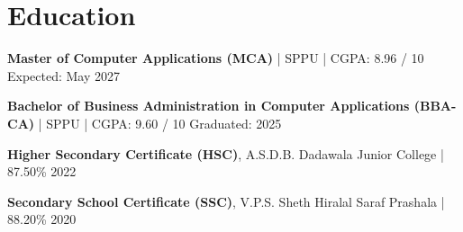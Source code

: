 \documentclass[a4paper,10pt]{article}
\begin{document}
\section*{Education}

\textbf{Master of Computer Applications (MCA)} | SPPU | CGPA: 8.96 / 10 \hfill Expected: May 2027

\vspace{4pt}

\textbf{Bachelor of Business Administration in Computer Applications (BBA-CA)} | SPPU | CGPA: 9.60 / 10 \hfill Graduated: 2025 

\vspace{4pt}
\textbf{Higher Secondary Certificate (HSC)}, A.S.D.B. Dadawala Junior College | 87.50\% \hfill 2022 
 
\vspace{4pt}
\textbf{Secondary School Certificate (SSC)}, V.P.S. Sheth Hiralal Saraf Prashala | 88.20\% \hfill 2020
\end{document}
